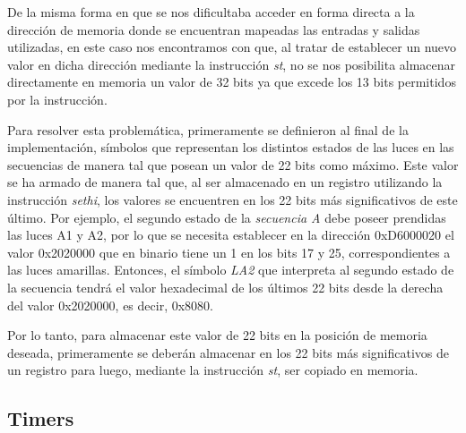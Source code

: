 \documentclass{article}
\begin{document}
	De la misma forma en que se nos dificultaba acceder en forma directa a la dirección de memoria donde se encuentran mapeadas las entradas y salidas utilizadas, en este caso nos encontramos con que, al tratar de establecer un nuevo valor en dicha dirección mediante la instrucción \textit{st}, no se nos posibilita almacenar directamente en memoria un valor de 32 bits ya que excede los 13 bits permitidos por la instrucción. 
	\par
	Para resolver esta problemática, primeramente se definieron al final de la implementación, símbolos que representan los distintos estados de las luces en las secuencias de manera tal que posean un valor de 22 bits como máximo. Este valor se ha armado de manera tal que, al ser almacenado en un registro utilizando la instrucción \textit{sethi}, los valores se encuentren en los 22 bits más significativos de este último. Por ejemplo, el segundo estado de la \textit{secuencia A} debe poseer prendidas las luces A1 y A2, por lo que se necesita establecer en la dirección 0xD6000020 el valor 0x2020000 que en binario tiene un 1 en los bits 17 y 25, correspondientes a las luces amarillas. Entonces, el símbolo \textit{LA2} que interpreta al segundo estado de la secuencia tendrá el valor hexadecimal de los últimos 22 bits desde la derecha del valor 0x2020000, es decir, 0x8080.
	\par
	Por lo tanto, para almacenar este valor de 22 bits en la posición de memoria deseada, primeramente se deberán almacenar en los 22 bits más significativos de un registro para luego, mediante la instrucción \textit{st}, ser copiado en memoria.
	\bigskip\medskip



\subsection{Timers}
\medskip
	
\end{document}
